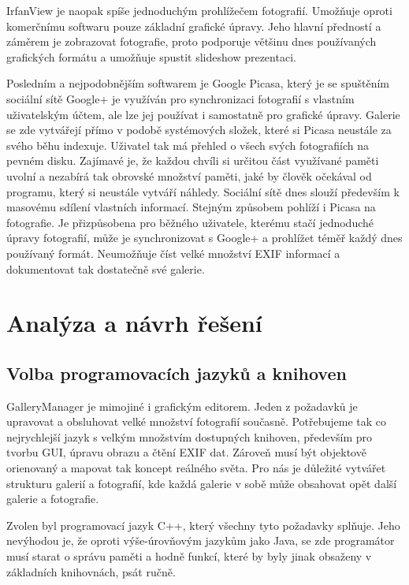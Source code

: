 \documentclass[11pt,twoside,a4paper]{book}
\begin{document}
\indent
IrfanView je naopak spíše jednoduchým prohlížečem fotografií. Umožňuje oproti komerčnímu softwaru pouze základní grafické úpravy. Jeho hlavní předností a záměrem je zobrazovat fotografie, proto podporuje většinu dnes používaných grafických formátu a umožňuje spustit slideshow prezentaci.

\indent
Posledním a nejpodobnějším softwarem je Google Picasa, který je se spuštěním sociální sítě Google+ je využíván pro synchronizaci fotografií s vlastním uživatelským účtem, ale lze jej používat i samostatně pro grafické úpravy. Galerie se zde vytvářejí přímo v podobě systémových složek, které si Picasa neustále za svého běhu indexuje. Uživatel tak má přehled o všech svých fotografiích na pevném disku. Zajímavé je, že každou chvíli si určitou část využívané paměti uvolní a nezabírá tak obrovské množství paměti, jaké by člověk očekával od programu, který si neustále vytváří náhledy.
\indent
Sociální sítě dnes slouží především k masovému sdílení vlastních informací. Stejným způsobem pohlíží i Picasa na fotografie. Je přizpůsobena pro běžného uživatele, kterému stačí jednoduché úpravy fotografií, může je synchronizovat s Google+ a prohlížet téměř každý dnes používaný formát. Neumožňuje číst velké množství EXIF informací a dokumentovat tak dostatečně své galerie.


%

\chapter{Analýza a návrh řešení}
\section{Volba programovacích jazyků a knihoven}
\noindent
GalleryManager je mimojiné i grafickým editorem. Jeden z požadavků je upravovat a obsluhovat velké množství fotografií současně. Potřebujeme tak co nejrychlejší jazyk s velkým množstvím dostupných knihoven, především pro tvorbu GUI, úpravu obrazu a čtění EXIF dat. Zároveň musí být objektově orienovaný a mapovat tak koncept reálného světa. Pro nás je důležité vytvářet strukturu galerií a fotografií, kde každá galerie v sobě může obsahovat opět další galerie a fotografie. 

\indent 
Zvolen byl programovací jazyk C++, který všechny tyto požadavky splňuje. Jeho nevýhodou je, že oproti výše-úrovňovým jazykům jako Java, se zde programátor musí starat o správu paměti a hodně funkcí, které by byly jinak obsaženy v základních knihovnách, psát ručně.
\end{document}
